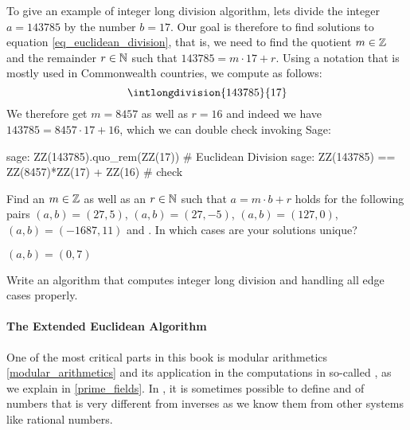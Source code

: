 \begin{example} To give an example of integer long division algorithm, lets divide the integer $a=143785$ by the number $b=17$. Our goal is therefore to find solutions to equation \ref{eq_euclidean_division}, that is, we need to find the quotient $m\in\mathbb{Z}$ and the remainder $r \in \mathbb{N}$ such that $143785 = m\cdot 17 + r$. Using a notation that is mostly used in Commonwealth countries, we compute as follows:
\begin{equation}
\intlongdivision{143785}{17}
\end{equation}
We therefore get $m=8457$ as well as $r=16$ and indeed we have $143785 = 8457\cdot 17 + 16$, which we can double check invoking Sage:
\begin{sagecommandline}
sage: ZZ(143785).quo_rem(ZZ(17)) # Euclidean Division
sage: ZZ(143785) == ZZ(8457)*ZZ(17) + ZZ(16) # check
\end{sagecommandline}

\end{example}
\begin{exercise}
Find an $m\in\mathbb{Z}$ as well as an $r\in\mathbb{N}$ such that $a= m\cdot b +r$ holds for the following pairs $(a,b) = (27,5)$, $(a,b)=(27,-5)$, $(a,b)=(127,0)$, $(a,b)= (-1687, 11)$ and . In which cases are your solutions unique?
\end{exercise}$(a,b)= (0, 7)$
\begin{exercise}
Write an algorithm that computes integer long division and handling all edge cases properly.
\end{exercise}

\paragraph{The Extended Euclidean Algorithm}
One of the most critical parts in this book is modular arithmetics \ref{modular_arithmetics} and its application in the computations in so-called , as we explain in \ref{prime_fields}. In , it is sometimes possible to define  and  of numbers that is very different from inverses as we know them from other systems like rational numbers. 

